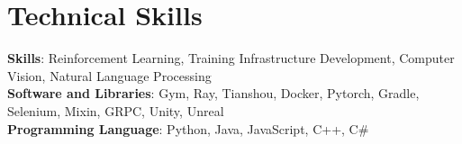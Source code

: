 \documentclass[letterpaper,11pt]{article}
\makeatletter
\newcommand{\resumeProjectHeading}[2]{
    \item
    \begin{tabular*}{1.001\textwidth}{l@{\extracolsep{\fill}}r}
      \small#1 & \textbf{\small #2}\\
    \end{tabular*}\vspace{-7pt}
}
\newcommand{\resumeSubHeadingListStart}{\begin{itemize}[leftmargin=0.0in, label={}]}
\newcommand{\resumeSubHeadingListEnd}{\end{itemize}}
\makeatother
\begin{document}

%
\section{Technical Skills}
 \begin{itemize}[leftmargin=0.15in, label={}]
    \small{\item{
     \textbf{Skills}{: Reinforcement Learning, Training Infrastructure Development, Computer Vision, Natural Language Processing} \\
     \textbf{Software and Libraries}{: Gym, Ray, Tianshou, Docker, Pytorch, Gradle, Selenium, Mixin, GRPC, Unity, Unreal} \\
     \textbf{Programming Language}{: Python, Java, JavaScript, C++, C\#} \\
    }}
 \end{itemize}
 \vspace{-16pt}
\end{document}
